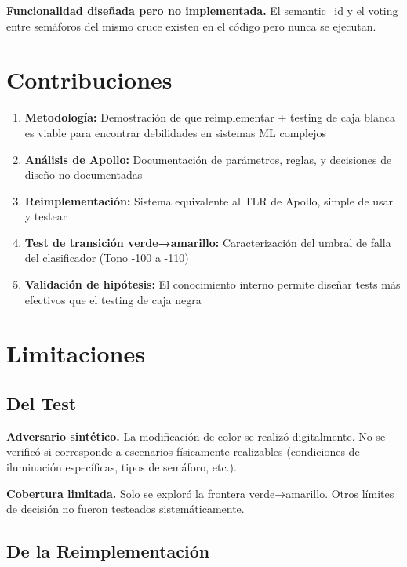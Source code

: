 \textbf{Funcionalidad diseñada pero no implementada.} El semantic\_id y el voting entre semáforos del mismo cruce existen en el código pero nunca se ejecutan.

\section{Contribuciones}

\begin{enumerate}
    \item \textbf{Metodología:} Demostración de que reimplementar + testing de caja blanca es viable para encontrar debilidades en sistemas ML complejos

    \item \textbf{Análisis de Apollo:} Documentación de parámetros, reglas, y decisiones de diseño no documentadas

    \item \textbf{Reimplementación:} Sistema equivalente al TLR de Apollo, simple de usar y testear

    \item \textbf{Test de transición verde→amarillo:} Caracterización del umbral de falla del clasificador (Tono -100 a -110)

    \item \textbf{Validación de hipótesis:} El conocimiento interno permite diseñar tests más efectivos que el testing de caja negra
\end{enumerate}

\section{Limitaciones}

\subsection{Del Test}

\textbf{Adversario sintético.} La modificación de color se realizó digitalmente. No se verificó si corresponde a escenarios físicamente realizables (condiciones de iluminación específicas, tipos de semáforo, etc.).

\textbf{Cobertura limitada.} Solo se exploró la frontera verde→amarillo. Otros límites de decisión no fueron testeados sistemáticamente.

\subsection{De la Reimplementación}

